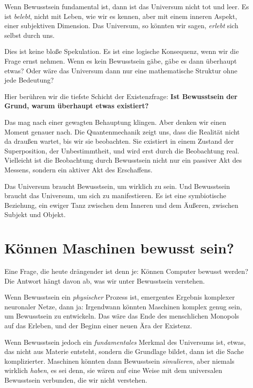 Wenn Bewusstsein fundamental ist, dann ist das Universum nicht tot und leer. Es ist \emph{belebt}, nicht mit Leben, wie wir es kennen, aber mit einem inneren Aspekt, einer subjektiven Dimension. Das Universum, so könnten wir sagen, \emph{erlebt} sich selbst durch uns.

Dies ist keine bloße Spekulation. Es ist eine logische Konsequenz, wenn wir die Frage ernst nehmen. Wenn es kein Bewusstsein gäbe, gäbe es dann überhaupt \glqq etwas\grqq? Oder wäre das Universum dann nur eine mathematische Struktur ohne jede Bedeutung?

Hier berühren wir die tiefste Schicht der Existenzfrage: \textbf{Ist Bewusstsein der Grund, warum überhaupt etwas existiert?}

Das mag nach einer gewagten Behauptung klingen. Aber denken wir einen Moment genauer nach. Die Quantenmechanik zeigt uns, dass die Realität nicht \glqq da draußen\grqq{} wartet, bis wir sie beobachten. Sie existiert in einem Zustand der Superposition, der Unbestimmtheit, und wird erst durch die Beobachtung \glqq real\grqq{}. Vielleicht ist die Beobachtung durch Bewusstsein nicht nur ein passiver Akt des Messens, sondern ein aktiver Akt des Erschaffens.

Das Universum braucht Bewusstsein, um \glqq wirklich\grqq{} zu sein. Und Bewusstsein braucht das Universum, um sich zu manifestieren. Es ist eine symbiotische Beziehung, ein ewiger Tanz zwischen dem Inneren und dem Äußeren, zwischen Subjekt und Objekt.

\section{Können Maschinen bewusst sein?}

Eine Frage, die heute drängender ist denn je: Können Computer bewusst werden? Die Antwort hängt davon ab, was wir unter Bewusstsein verstehen.

Wenn Bewusstsein ein \emph{physischer} Prozess ist, emergentes Ergebnis komplexer neuronaler Netze, dann ja: Irgendwann könnten Maschinen komplex genug sein, um Bewusstsein zu entwickeln. Das wäre das Ende des menschlichen Monopols auf das Erleben, und der Beginn einer neuen Ära der Existenz.

Wenn Bewusstsein jedoch ein \emph{fundamentales} Merkmal des Universums ist, etwas, das nicht aus Materie \glqq entsteht\grqq{}, sondern die Grundlage bildet, dann ist die Sache komplizierter. Maschinen könnten dann Bewusstsein \emph{simulieren}, aber niemals wirklich \emph{haben}, es sei denn, sie wären auf eine Weise mit dem universalen Bewusstsein verbunden, die wir nicht verstehen.

